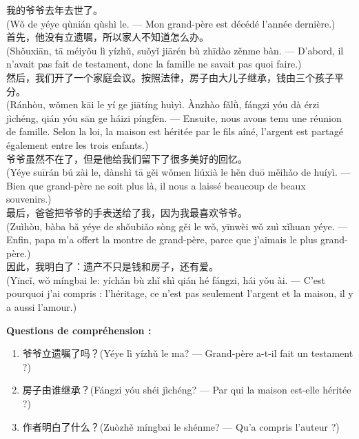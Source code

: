 \documentclass[11pt]{article}
\begin{document}
\begin{textebox}
我的爷爷去年去世了。\\(Wǒ de yéye qùnián qùshì le. — Mon grand-père est décédé l'année dernière.)\\[4pt]
首先，他没有立遗嘱，所以家人不知道怎么办。\\(Shǒuxiān, tā méiyǒu lì yízhǔ, suǒyǐ jiārén bù zhīdào zěnme bàn. — D'abord, il n'avait pas fait de testament, donc la famille ne savait pas quoi faire.)\\[4pt]
然后，我们开了一个家庭会议。按照法律，房子由大儿子继承，钱由三个孩子平分。\\(Ránhòu, wǒmen kāi le yí ge jiātíng huìyì. Ànzhào fǎlǜ, fángzi yóu dà érzi jìchéng, qián yóu sān ge háizi píngfēn. — Ensuite, nous avons tenu une réunion de famille. Selon la loi, la maison est héritée par le fils aîné, l'argent est partagé également entre les trois enfants.)\\[4pt]
爷爷虽然不在了，但是他给我们留下了很多美好的回忆。\\(Yéye suīrán bú zài le, dànshì tā gěi wǒmen liúxià le hěn duō měihǎo de huíyì. — Bien que grand-père ne soit plus là, il nous a laissé beaucoup de beaux souvenirs.)\\[4pt]
最后，爸爸把爷爷的手表送给了我，因为我最喜欢爷爷。\\(Zuìhòu, bàba bǎ yéye de shǒubiǎo sòng gěi le wǒ, yīnwèi wǒ zuì xǐhuan yéye. — Enfin, papa m'a offert la montre de grand-père, parce que j'aimais le plus grand-père.)\\[4pt]
因此，我明白了：遗产不只是钱和房子，还有爱。\\(Yīncǐ, wǒ míngbai le: yíchǎn bù zhǐ shì qián hé fángzi, hái yǒu ài. — C'est pourquoi j'ai compris : l'héritage, ce n'est pas seulement l'argent et la maison, il y a aussi l'amour.)
\end{textebox}

\textbf{Questions de compréhension :}
\begin{enumerate}
\item 爷爷立遗嘱了吗？(Yéye lì yízhǔ le ma? — Grand-père a-t-il fait un testament ?)
\item 房子由谁继承？(Fángzi yóu shéi jìchéng? — Par qui la maison est-elle héritée ?)
\item 作者明白了什么？(Zuòzhě míngbai le shénme? — Qu'a compris l'auteur ?)
\end{enumerate}
\end{document}
